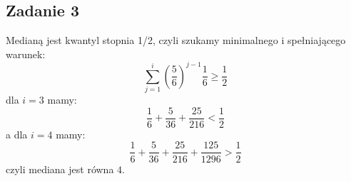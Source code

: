\subsection{Zadanie 3}

Medianą jest kwantyl stopnia 1/2, czyli szukamy minimalnego i spełniającego warunek:
$$
\sum_{j=1}^{i} \left( \frac{5}{6}\right)^{j-1}\frac{1}{6} \ge \frac{1}{2}
$$
dla $i = 3$ mamy: 
$$
\frac{1}{6} + \frac{5}{36} + \frac{25}{216} < \frac{1}{2}
$$
a dla $i = 4$ mamy: 
$$
\frac{1}{6} + \frac{5}{36} + \frac{25}{216} + \frac{125}{1296} > \frac{1}{2}
$$
czyli mediana jest równa $4$.
